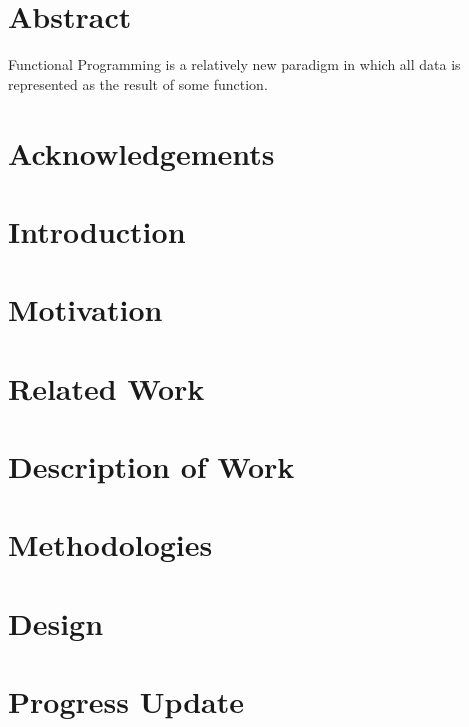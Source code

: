 \documentclass[12pt, doubleside, a4paper]{report}
\begin{document}
\maketitle

\section*{Abstract}
Functional Programming is a relatively new paradigm in which all data is represented as the result of some function.


\section*{Acknowledgements}

\tableofcontents
\pagebreak

\section{Introduction}


\section{Motivation}

\section{Related Work}
\section{Description of Work}
\section{Methodologies}
\section{Design}
\section{Progress Update}

\begin{thebibliography}{0}
\end{thebibliography}
\end{document}
